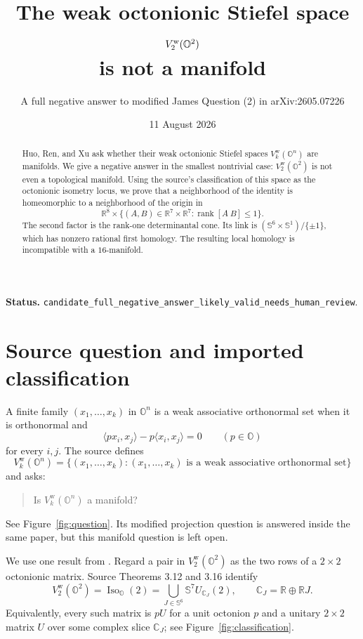 \documentclass[11pt]{article}
\title{The weak octonionic Stiefel space \(V^{\mathrm w}_2(\O^2)\)\\
is not a manifold}
\author{A full negative answer to modified James Question (2) in arXiv:2605.07226}
\date{11 August 2026}
\newcommand{\R}{\mathbb R}
\renewcommand{\O}{\mathbb O}
\newcommand{\Sph}{\mathbb S}
\newcommand{\Iso}{\operatorname{Iso}}
\begin{document}
\maketitle

\noindent\textbf{Status.}
\texttt{candidate\_full\_negative\_answer\_likely\_valid\_needs\_human\_review}.

\begin{abstract}
Huo, Ren, and Xu ask whether their weak octonionic Stiefel spaces
\(V^{\mathrm w}_k(\O^n)\) are manifolds. We give a negative answer in the
smallest nontrivial case: \(V^{\mathrm w}_2(\O^2)\) is not even a topological
manifold. Using the source's classification of this space as the octonionic
isometry locus, we prove that a neighborhood of the identity is homeomorphic
to a neighborhood of the origin in
\[
 \R^8\times
 \{(A,B)\in\R^7\times\R^7:
       \operatorname{rank}[A\ B]\le1\}.
\]
The second factor is the rank-one determinantal cone. Its link is
\((\Sph^6\times\Sph^1)/\{\pm1\}\), which has nonzero rational first
homology. The resulting local homology is incompatible with a
\(16\)-manifold.
\end{abstract}

\section{Source question and imported classification}

A finite family \((x_1,\ldots,x_k)\) in \(\O^n\) is a weak associative
orthonormal set when it is orthonormal and
\[
 \langle p x_i,x_j\rangle-p\langle x_i,x_j\rangle=0
 \qquad(p\in\O)
\]
for every \(i,j\). The source defines
\[
 V^{\mathrm w}_k(\O^n)
 =\{(x_1,\ldots,x_k):
       (x_1,\ldots,x_k)\text{ is a weak associative orthonormal set}\}
\]
and asks:
\begin{quote}
Is \(V^{\mathrm w}_k(\O^n)\) a manifold?
\end{quote}
See Figure~\ref{fig:question}. Its modified projection question is answered
inside the same paper, but this manifold question is left open.

We use one result from \cite{source}. Regard a pair in
\(V^{\mathrm w}_2(\O^2)\) as the two rows of a \(2\times2\) octonionic
matrix. Source Theorems 3.12 and 3.16 identify
\[
 V^{\mathrm w}_2(\O^2)=\Iso_{\O}(2)
 =\bigcup_{J\in\Sph^6} \Sph^7 U_{\mathbb C_J}(2),
 \qquad \mathbb C_J=\R\oplus\R J.
\]
Equivalently, every such matrix is \(pU\) for a unit octonion \(p\) and
a unitary \(2\times2\) matrix \(U\) over some complex slice
\(\mathbb C_J\); see Figure~\ref{fig:classification}.
\end{document}
